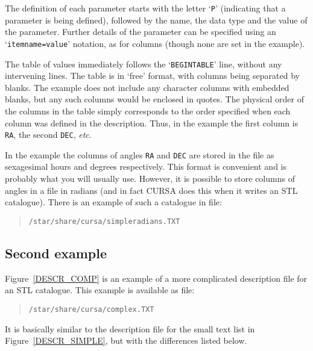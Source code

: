 \documentclass[twoside,11pt]{article}
\renewcommand{\_}{\texttt{\symbol{95}}}
\begin{document}
The definition of each parameter starts with the letter `{\tt P}'
(indicating that a parameter is being defined), followed by the name, the
data type and the value of the parameter.  Further details of the
parameter can be specified using an `{\tt item\_name=value}'
notation, as for columns (though none are set in the example).

The table of values immediately follows the `{\tt BEGINTABLE}' line,
without any intervening lines.  The table is in `free' format, with
columns being separated by blanks.  The example does not include any
character columns with embedded blanks, but any such columns would be
enclosed in quotes.  The physical order of the columns in the table
simply corresponds to the order specified when each column was defined
in the description.  Thus, in the example the first column is {\tt RA},
the second {\tt DEC}, \emph{etc}.

In the example the columns of angles {\tt RA} and {\tt DEC} are stored
in the file as sexagesimal hours and degrees respectively.  This format
is convenient and is probably what you will usually use.  However, it is
possible to store columns of angles in a file in radians (and in fact
CURSA does this when it writes an STL catalogue).  There is an example of
such a catalogue in file:

\begin{verse}
{\tt /star/share/cursa/simple\_radians.TXT}
\end{verse}

\subsection{Second example}

Figure~\ref{DESCR_COMP} is an example of a more complicated description
file for an STL catalogue.  This example is available as file:

\begin{verse}
{\tt /star/share/cursa/complex.TXT}
\end{verse}

It is basically similar to the description file for the small text list
in Figure~\ref{DESCR_SIMPLE}, but with the differences listed below.
\end{document}
